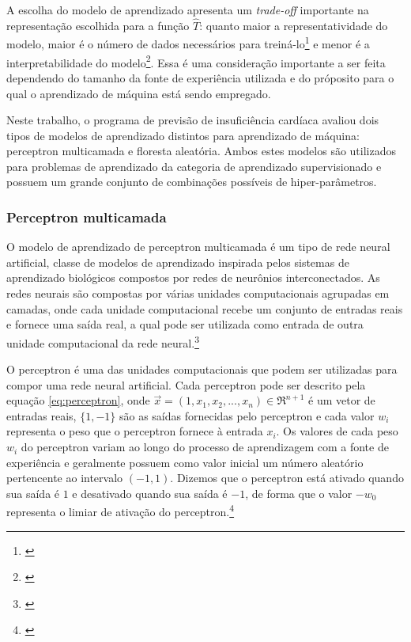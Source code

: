A escolha do modelo de aprendizado apresenta um \textit{trade-off} importante na representação escolhida para a função $\hat{T}$: quanto maior a representatividade do modelo, maior é o número de dados necessários para treiná-lo\footnote{\cite[p.8]{machine_learning}} e menor é a interpretabilidade do modelo\footnote{\cite[p.25]{statistical_learning}}. Essa é uma consideração importante a ser feita dependendo do tamanho da fonte de experiência utilizada e do próposito para o qual o aprendizado de máquina está sendo empregado.

Neste trabalho, o programa de previsão de insuficiência cardíaca avaliou dois tipos de modelos de aprendizado distintos para aprendizado de máquina: perceptron multicamada e floresta aleatória. Ambos estes modelos são utilizados para problemas de aprendizado da categoria de aprendizado supervisionado e possuem um grande conjunto de combinações possíveis de hiper-parâmetros.

\subsubsection{Perceptron multicamada}

O modelo de aprendizado de perceptron multicamada é um tipo de rede neural artificial, classe de modelos de aprendizado inspirada pelos sistemas de aprendizado biológicos compostos por redes de neurônios interconectados. As redes neurais são compostas por várias unidades computacionais agrupadas em camadas, onde cada unidade computacional recebe um conjunto de entradas reais e fornece uma saída real, a qual pode ser utilizada como entrada de outra unidade computacional da rede neural.\footnote{\cite[p.82]{machine_learning}}

O perceptron é uma das unidades computacionais que podem ser utilizadas para compor uma rede neural artificial. Cada perceptron pode ser descrito pela equação \ref{eq:perceptron}, onde $\vec{x} = (1, x_{1}, x_{2}, ..., x_{n}) \in \Re^{n+1}$ é um vetor de entradas reais, $\{1, -1\}$ são as saídas fornecidas pelo perceptron e cada valor $w_{i}$ representa o peso que o perceptron fornece à entrada $x_{i}$. Os valores de cada peso $w_{i}$ do perceptron variam ao longo do processo de aprendizagem com a fonte de experiência e geralmente possuem como valor inicial um número aleatório pertencente ao intervalo $(-1, 1)$. Dizemos que o perceptron está ativado quando sua saída é $1$ e desativado quando sua saída é $-1$, de forma que o valor $-w_{0}$ representa o limiar de ativação do perceptron.\footnote{\cite[p.86]{machine_learning}}

